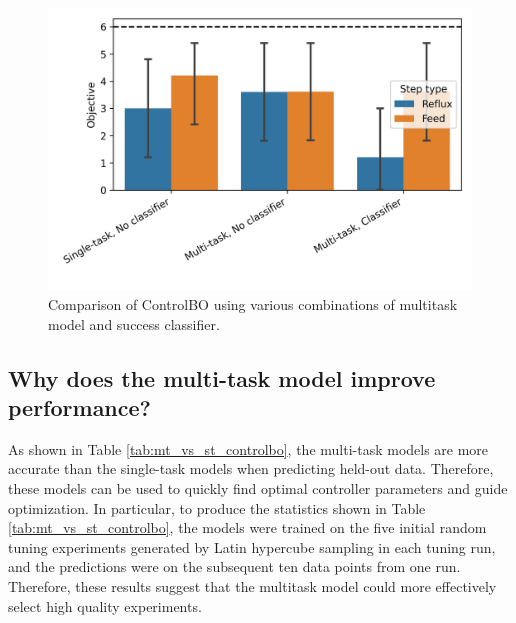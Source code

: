 \begin{figure}
    \centering
    \includegraphics[width=\textwidth]{gfx/Chapter06/comparison.png}
    \caption{Comparison of ControlBO using various combinations of multitask model and success classifier.}
    \label{fig:comparison_controlbo}
\end{figure}



\subsection{Why does the multi-task model improve performance?}

As shown in Table \ref{tab:mt_vs_st_controlbo}, the multi-task models are more accurate than the single-task models when predicting held-out data. Therefore, these models can be used to quickly find optimal controller parameters and guide optimization. In particular, to produce the statistics shown in Table \ref{tab:mt_vs_st_controlbo}, the models were trained on the five initial random tuning experiments generated by Latin hypercube sampling in each tuning run, and the predictions were on the subsequent ten data points from one run. Therefore, these results suggest that the multitask model could more effectively select high quality experiments.

